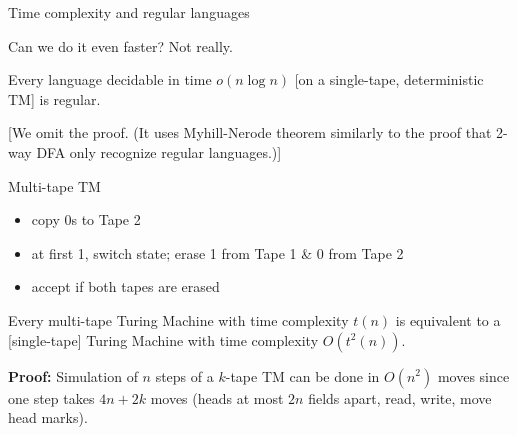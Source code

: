 \documentclass[handout]{beamer}
\begin{document}
\begin{frame}{Time complexity and regular languages}
    
    Can we do it even faster? Not really.

    \begin{theorem}
        Every language decidable in time $o(n \log n)$ [on a single-tape, deterministic TM] is regular. %
    \end{theorem}

    [We omit the proof. (It uses Myhill-Nerode theorem similarly to the proof that 2-way DFA only recognize regular languages.)]

\end{frame}

    
\begin{frame}{Multi-tape TM}
    
    \begin{example}[Multi-tape TM for $L=\{0^i1^i \mid  i\geq 0\}$]
        \begin{itemize}
            \item copy 0s to Tape 2
            \item at first 1, switch state; erase 1 from Tape 1 \& 0 from Tape 2
            \item accept if both tapes are erased
        \end{itemize}
    \end{example}
    
    \begin{lemma}
        Every multi-tape Turing Machine with time complexity $t(n)$ is equivalent to a [single-tape] Turing Machine with time complexity $O(t^2(n))$.
    \end{lemma}
    \textbf{Proof:} Simulation of $n$ steps of a $k$-tape TM can be done in $O(n^2)$ moves since one step takes $4n+2k$ moves (heads at most $2n$ fields apart, read, write, move head marks).\hfill\qedsymbol

\end{frame}
\end{document}
